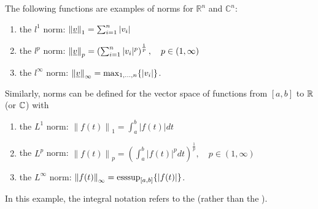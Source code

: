 \begin{example}
The following functions are examples of norms for $\mathbb{R}^n$ and $\mathbb{C}^n$:
\begin{enumerate}
\item the $l^1$ norm: $\left\| \underline{v} \right\|_1 = \sum_{i=1}^n |v_i|$
\item the $l^p$ norm: $\left\| \underline{v} \right\|_p = \left( \sum_{i=1}^n |v_i|^p \right)^{\frac{1}{p}}, \quad p \in (1,\infty)$
\item the $l^{\infty}$ norm: $\left\| \underline{v} \right\|_{\infty} = \max_{1,\ldots, n} \{ |v_i| \}$.
\end{enumerate}
\end{example}

\begin{example}
Similarly, norms can be defined for the vector space of functions from $[a, b]$ to $\mathbb{R}$ (or $\mathbb{C}$) with
\begin{enumerate}
\item the $L^1$ norm: $\left\| f(t) \right\|_1 = \int_a^b |f(t)| dt$
\item the $L^p$ norm: $\left\| f(t) \right\|_p = \left( \int_a^b |f(t)|^p dt \right)^{\frac{1}{p}}, \quad p \in (1,\infty)$
\item the $L^{\infty}$ norm: $\left\| f(t) \right\|_{\infty} = \operatorname{esssup}_{[a,b]} \{ | f(t) | \}$.
\end{enumerate}
\end{example}

In this example, the integral notation refers to the  (rather than the ).

\vfill

\newpage

